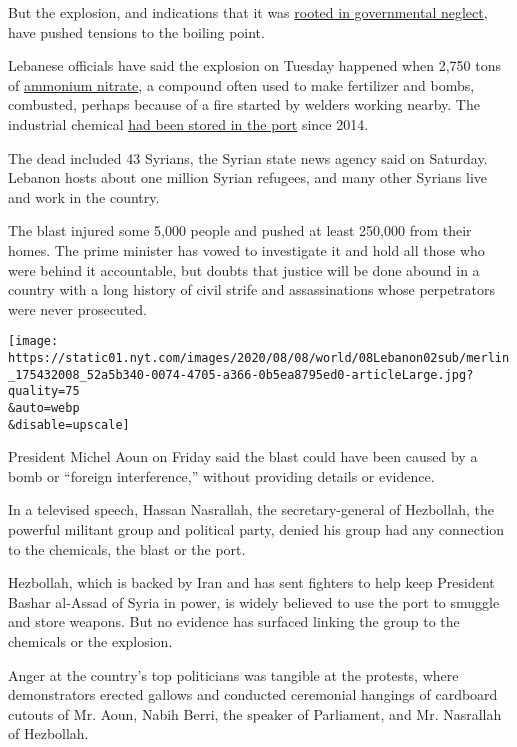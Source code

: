 But the explosion, and indications that it was
\href{https://www.nytimes.com/2020/08/05/world/middleeast/beirut-explosion-lebanon.html}{rooted
in governmental neglect}, have pushed tensions to the boiling point.

Lebanese officials have said the explosion on Tuesday happened when
2,750 tons of
\href{https://www.nytimes.com/2020/08/05/world/middleeast/beirut-explosion-ammonium-nitrate.html}{ammonium
nitrate}, a compound often used to make fertilizer and bombs, combusted,
perhaps because of a fire started by welders working nearby. The
industrial chemical
\href{https://www.nytimes.com/2020/08/05/world/middleeast/beirut-explosion-ship.html}{had
been stored in the port} since 2014.

The dead included 43 Syrians, the Syrian state news agency said on
Saturday. Lebanon hosts about one million Syrian refugees, and many
other Syrians live and work in the country.

The blast injured some 5,000 people and pushed at least 250,000 from
their homes. The prime minister has vowed to investigate it and hold all
those who were behind it accountable, but doubts that justice will be
done abound in a country with a long history of civil strife and
assassinations whose perpetrators were never prosecuted.

\texttt{[image: https://static01.nyt.com/images/2020/08/08/world/08Lebanon02sub/merlin\_175432008\_52a5b340-0074-4705-a366-0b5ea8795ed0-articleLarge.jpg?quality=75\\\&auto=webp\\\&disable=upscale]}

President Michel Aoun on Friday said the blast could have been caused by
a bomb or ``foreign interference,'' without providing details or
evidence.

In a televised speech, Hassan Nasrallah, the secretary-general of
Hezbollah, the powerful militant group and political party, denied his
group had any connection to the chemicals, the blast or the port.

Hezbollah, which is backed by Iran and has sent fighters to help keep
President Bashar al-Assad of Syria in power, is widely believed to use
the port to smuggle and store weapons. But no evidence has surfaced
linking the group to the chemicals or the explosion.

Anger at the country's top politicians was tangible at the protests,
where demonstrators erected gallows and conducted ceremonial hangings of
cardboard cutouts of Mr. Aoun, Nabih Berri, the speaker of Parliament,
and Mr. Nasrallah of Hezbollah.

